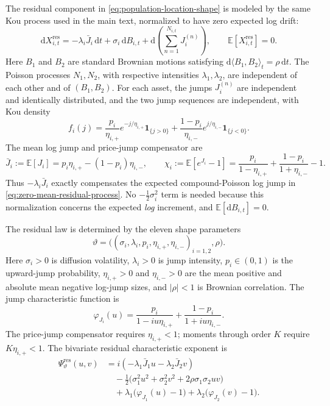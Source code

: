 \documentclass[11pt]{article}
\newcommand{\E}{\mathbb{E}}
\newcommand{\diff}{\mathrm{d}}
\newcommand{\one}{\mathbf{1}}
\begin{document}
The residual component in \eqref{eq:population-location-shape} is modeled by the same Kou
process used in the main text, normalized to have zero expected log drift:
\begin{equation}\label{eq:zero-mean-residual-process}
\diff X_{i,t}^{\mathrm{res}}
=-\lambda_i\bar J_i\,\diff t+\sigma_i\,\diff B_{i,t}
+\diff\!\left(\sum_{n=1}^{N_{i,t}}J_i^{(n)}\right),
\qquad
\E[X_{i,t}^{\mathrm{res}}]=0.
\end{equation}
Here $B_1$ and $B_2$ are standard Brownian motions satisfying
$\diff\langle B_1,B_2\rangle_t=\rho\,\diff t$. The Poisson processes $N_1,N_2$, with
respective intensities $\lambda_1,\lambda_2$, are independent of each other and of
$(B_1,B_2)$. For each asset, the jumps $J_i^{(n)}$ are independent and identically
distributed, and the two jump sequences are independent, with Kou density
\begin{equation}\label{eq:residual-kou-density}
f_i(j)
=
\frac{p_i}{\eta_{i,+}}e^{-j/\eta_{i,+}}\one_{\{j>0\}}
+\frac{1-p_i}{\eta_{i,-}}e^{j/\eta_{i,-}}\one_{\{j<0\}}.
\end{equation}
The mean log jump and price-jump compensator are
\begin{equation}\label{eq:jump-means}
\bar J_i:=\E[J_i]=p_i\eta_{i,+}-(1-p_i)\eta_{i,-},
\qquad
\chi_i:=\E[e^{J_i}-1]
=\frac{p_i}{1-\eta_{i,+}}+\frac{1-p_i}{1+\eta_{i,-}}-1.
\end{equation}
Thus $-\lambda_i\bar J_i$ exactly compensates the expected compound-Poisson log jump in
\eqref{eq:zero-mean-residual-process}. No $-\tfrac12\sigma_i^2$ term is needed because this
normalization concerns the expected \emph{log} increment, and $\E[\diff B_{i,t}]=0$.

The residual law is determined by the eleven shape parameters
\[
\vartheta
=\bigl((\sigma_i,\lambda_i,p_i,\eta_{i,+},\eta_{i,-})_{i=1,2},\rho\bigr).
\]
Here $\sigma_i>0$ is diffusion volatility, $\lambda_i>0$ is jump intensity,
$p_i\in(0,1)$ is the upward-jump probability, $\eta_{i,+}>0$ and $\eta_{i,-}>0$ are the
mean positive and absolute mean negative log-jump sizes, and $|\rho|<1$ is Brownian
correlation. The jump characteristic function is
\begin{equation}\label{eq:jump-cf}
\varphi_{J_i}(u)
=\frac{p_i}{1-iu\eta_{i,+}}+\frac{1-p_i}{1+iu\eta_{i,-}}.
\end{equation}
The price-jump compensator requires $\eta_{i,+}<1$; moments through order $K$ require
$K\eta_{i,+}<1$. The bivariate residual characteristic exponent is
\begin{equation}\label{eq:residual-characteristic-exponent}
\begin{aligned}
\Psi_\vartheta^{\mathrm{res}}(u,v)
&=i(-\lambda_1\bar J_1u-\lambda_2\bar J_2v)\\
&\quad-\frac12\bigl(\sigma_1^2u^2+\sigma_2^2v^2
+2\rho\sigma_1\sigma_2uv\bigr)\\
&\quad+\lambda_1\bigl(\varphi_{J_1}(u)-1\bigr)
+\lambda_2\bigl(\varphi_{J_2}(v)-1\bigr).
\end{aligned}
\end{equation}
\end{document}
